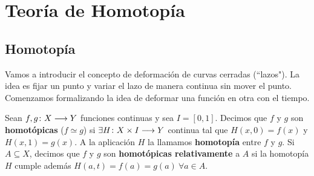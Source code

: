 \documentclass[GTS.tex]{subfiles}
\begin{document}
%
\renewcommand\chaptername{\Huge Tema}
%
\titleformat{\chapter}[display]
    {\normalfont\huge\bfseries}{\chaptertitlename\ \thechapter}{10pt}{\Huge}
\titlespacing*{\chapter}{0pt}{-1cm}{10pt}
%
\chapter{Teoría de Homotopía}

\section{Homotopía}
Vamos a introducir el concepto de deformación de curvas cerradas (``lazos"). La idea es fijar un punto y variar el lazo de manera continua sin mover el punto. Comenzamos formalizando la idea de deformar una función en otra con el tiempo. 

\begin{defi} Sean $f,g\colon{X}\longrightarrow{Y}$ funciones continuas y sea $I=[0,1]$. Decimos que $f$ y $g$ son \textbf{homotópicas} ($f\simeq g$) si $\exists H\colon{X\times I}\longrightarrow{Y}$ continua tal que $H(x,0)=f(x)$ y $H(x,1)=g(x)$. A la aplicación $H$ la llamamos \textbf{homotopía} entre $f$ y $g$. Si $A\subseteq X$, decimos que $f$ y $g$ son \textbf{homotópicas relativamente} a $A$ si la homotopía $H$ cumple además $H(a,t)=f(a)=g(a)\ \forall a\in A$.
\end{defi}

\vspace{0.1cm}
\end{document}
